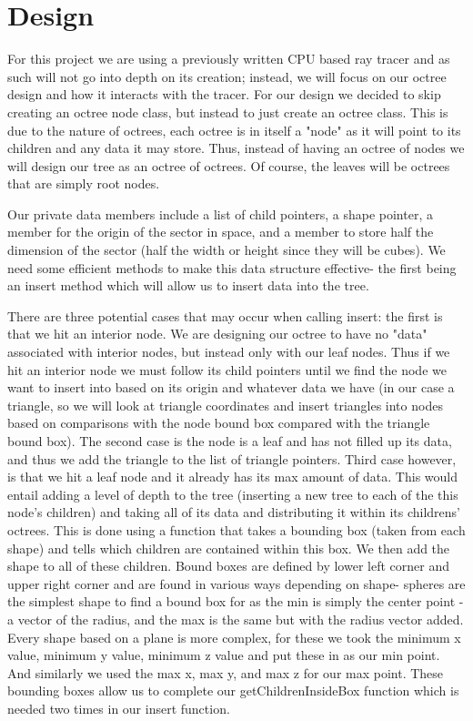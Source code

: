 \section{Design}

        \par For this project we are using a previously written CPU based ray tracer and as such will not go into depth on its creation; instead, we will focus on our octree design and how it interacts with the tracer. For our design we decided to skip creating an octree node class, but instead to just create an octree class. This is due to the nature of octrees, each octree is in itself a "node" as it will point to its children and any data it may store. Thus, instead of having an octree of nodes we will design our tree as an octree of octrees. Of course, the leaves will be octrees that are simply root nodes.
        \par Our private data members include a list of child pointers, a shape pointer, a member for the origin of the sector in space, and a member to store half the dimension of the sector (half the width or height since they will be cubes). We need some efficient methods to make this data structure effective- the first being an insert method which will allow us to insert data into the tree. 
        \par There are three potential cases that may occur when calling insert: the first is that we hit an interior node. We are designing our octree to have no "data" associated with interior nodes, but instead only with our leaf nodes. Thus if we hit an interior node we must follow its child pointers until we find the node we want to insert into based on its origin and whatever data we have (in our case a triangle, so we will look at triangle coordinates and insert triangles into nodes based on comparisons with the node bound box compared with the triangle bound box). The second case is the node is a leaf and has not filled up its data, and thus we add the triangle to the list of triangle pointers. Third case however, is that we hit a leaf node and it already has its max amount of data. This would entail adding a level of depth to the tree (inserting a new tree to each of the this node's children) and taking all of its data and distributing it within its childrens' octrees. This is done using a function that takes a bounding box (taken from each shape) and tells which children are contained within this box. We then add the shape to all of these children. Bound boxes are defined by lower left corner and upper right corner and are found in various ways depending on shape- spheres are the simplest shape to find a bound box for as the min is simply the center point - a vector of the radius, and the max is the same but with the radius vector added. Every shape based on a plane is more complex, for these we took the minimum x value, minimum y value, minimum z value and put these in as our min point. And similarly we used the max x, max y, and max z for our max point. These bounding boxes allow us to complete our getChildrenInsideBox function which is needed two times in our insert function.
